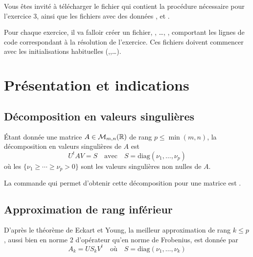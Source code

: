 \documentclass[a4paper,12pt,reqno]{amsart}
\begin{document}

Vous êtes invité à télécharger le fichier  qui contient la procédure  nécessaire pour l'exercice 3, ainsi que les fichiers avec des données ,  et .

Pour chaque exercice, il va falloir créer un fichier, , \dots, , comportant les lignes de code correspondant à la résolution de l'exercice. Ces fichiers doivent commencer avec les initialisations habituelles (,,\dots).\\[1ex]

\section{Présentation et indications}

\subsection*{Décomposition en valeurs singulières}

Étant donnée une matrice $A\in{\mathcal M}_{m,n}(\mathbb{R})$ de rang $p\leq \min (m,n)$, la décomposition en valeurs singulières de $A$ est
  $$
    U^tAV = S \quad\text{avec}\quad S = \mbox{diag} (\nu_1, \ldots , \nu_p )
  $$
où les $\{\nu_1 \geq \cdots \geq \nu_p > 0\}$ sont les valeurs singulières non nulles de $A$.

La commande  qui permet d'obtenir cette décomposition pour une matrice  est .

\subsection*{Approximation de rang inférieur}

D'après le théorème de Eckart et Young, la meilleur approximation de rang $k \leq p$, aussi bien en norme $2$ d'opérateur qu'en norme de Frobenius, est donnée par
  $$
    A_{k} = US_{k}V^{t} \quad\text{où}\quad S = \mbox{diag} (\nu_1, \ldots , \nu_k )
  $$
\end{document}
